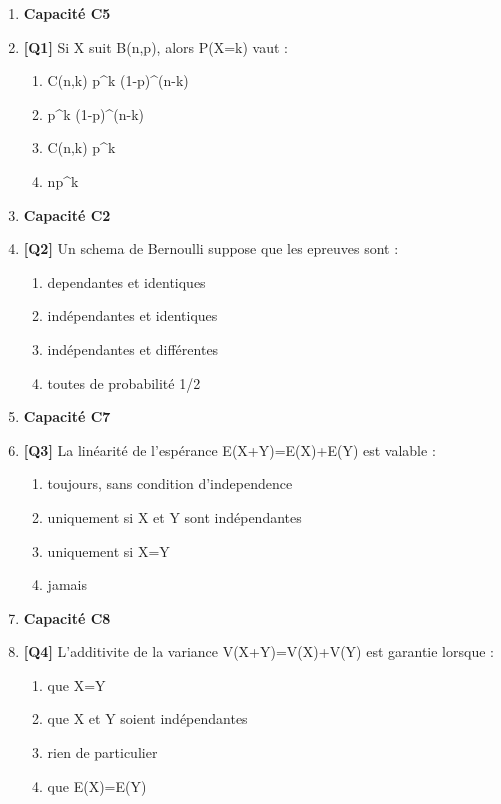 \begin{enumerate}

\item[] \textbf{Capacité C5}

\item \textbf{[Q1]} Si X suit B(n,p), alors P(X=k) vaut :
  \begin{enumerate}[label=\Alph*.]
    \item C(n,k) p\textasciicircum{}k (1-p)\textasciicircum{}(n-k)
    \item p\textasciicircum{}k (1-p)\textasciicircum{}(n-k)
    \item C(n,k) p\textasciicircum{}k
    \item np\textasciicircum{}k
  \end{enumerate}

\item[] \textbf{Capacité C2}

\item \textbf{[Q2]} Un schema de Bernoulli suppose que les epreuves sont :
  \begin{enumerate}[label=\Alph*.]
    \item dependantes et identiques
    \item indépendantes et identiques
    \item indépendantes et différentes
    \item toutes de probabilité 1/2
  \end{enumerate}

\item[] \textbf{Capacité C7}

\item \textbf{[Q3]} La linéarité de l'espérance E(X+Y)=E(X)+E(Y) est valable :
  \begin{enumerate}[label=\Alph*.]
    \item toujours, sans condition d'independence
    \item uniquement si X et Y sont indépendantes
    \item uniquement si X=Y
    \item jamais
  \end{enumerate}

\item[] \textbf{Capacité C8}

\item \textbf{[Q4]} L'additivite de la variance V(X+Y)=V(X)+V(Y) est garantie lorsque :
  \begin{enumerate}[label=\Alph*.]
    \item que X=Y
    \item que X et Y soient indépendantes
    \item rien de particulier
    \item que E(X)=E(Y)
  \end{enumerate}


\end{enumerate}
